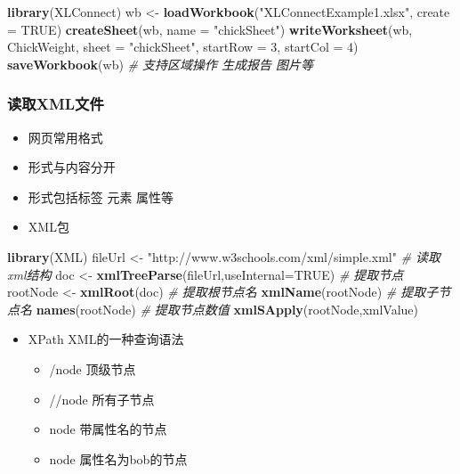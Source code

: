 \documentclass[]{book}
\newenvironment{Shaded}{\begin{snugshade}}{\end{snugshade}}
\newcommand{\CommentTok}[1]{\textcolor[rgb]{0.56,0.35,0.01}{\textit{#1}}}
\newcommand{\DataTypeTok}[1]{\textcolor[rgb]{0.13,0.29,0.53}{#1}}
\newcommand{\DecValTok}[1]{\textcolor[rgb]{0.00,0.00,0.81}{#1}}
\newcommand{\KeywordTok}[1]{\textcolor[rgb]{0.13,0.29,0.53}{\textbf{#1}}}
\newcommand{\NormalTok}[1]{#1}
\newcommand{\OtherTok}[1]{\textcolor[rgb]{0.56,0.35,0.01}{#1}}
\newcommand{\StringTok}[1]{\textcolor[rgb]{0.31,0.60,0.02}{#1}}
\providecommand{\tightlist}{%
  \setlength{\itemsep}{0pt}\setlength{\parskip}{0pt}}
\begin{document}
\begin{Shaded}
\begin{Highlighting}[]
\KeywordTok{library}\NormalTok{(XLConnect)}
\NormalTok{wb <-}\StringTok{ }\KeywordTok{loadWorkbook}\NormalTok{(}\StringTok{"XLConnectExample1.xlsx"}\NormalTok{, }\DataTypeTok{create =} \OtherTok{TRUE}\NormalTok{)}
\KeywordTok{createSheet}\NormalTok{(wb, }\DataTypeTok{name =} \StringTok{"chickSheet"}\NormalTok{)}
\KeywordTok{writeWorksheet}\NormalTok{(wb, ChickWeight, }\DataTypeTok{sheet =} \StringTok{"chickSheet"}\NormalTok{, }\DataTypeTok{startRow =} \DecValTok{3}\NormalTok{, }\DataTypeTok{startCol =} \DecValTok{4}\NormalTok{)}
\KeywordTok{saveWorkbook}\NormalTok{(wb)}
\CommentTok{# 支持区域操作 生成报告 图片等}
\end{Highlighting}
\end{Shaded}

\hypertarget{ux8bfbux53d6xmlux6587ux4ef6}{%
\subsubsection{读取XML文件}\label{ux8bfbux53d6xmlux6587ux4ef6}}

\begin{itemize}
\tightlist
\item
  网页常用格式
\item
  形式与内容分开
\item
  形式包括标签 元素 属性等
\item
  XML包
\end{itemize}

\begin{Shaded}
\begin{Highlighting}[]
\KeywordTok{library}\NormalTok{(XML)}
\NormalTok{fileUrl <-}\StringTok{ "http://www.w3schools.com/xml/simple.xml"}
\CommentTok{# 读取xml结构}
\NormalTok{doc <-}\StringTok{ }\KeywordTok{xmlTreeParse}\NormalTok{(fileUrl,}\DataTypeTok{useInternal=}\OtherTok{TRUE}\NormalTok{)}
\CommentTok{# 提取节点}
\NormalTok{rootNode <-}\StringTok{ }\KeywordTok{xmlRoot}\NormalTok{(doc)}
\CommentTok{# 提取根节点名}
\KeywordTok{xmlName}\NormalTok{(rootNode)}
\CommentTok{# 提取子节点名}
\KeywordTok{names}\NormalTok{(rootNode) }
\CommentTok{# 提取节点数值}
\KeywordTok{xmlSApply}\NormalTok{(rootNode,xmlValue)}
\end{Highlighting}
\end{Shaded}

\begin{itemize}
\tightlist
\item
  XPath XML的一种查询语法

  \begin{itemize}
  \tightlist
  \item
    /node 顶级节点
  \item
    //node 所有子节点
  \item
    node\citep{attr-name} 带属性名的节点
  \item
    node\citep[=`bob']{attr-name} 属性名为bob的节点
  \end{itemize}
\end{itemize}
\end{document}
